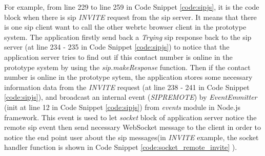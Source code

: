 \par For example, from line 229 to line 259 in Code Snippet \ref{code:sipjs}, it is the code block when there is \gls{sip} \textit{INVITE} request from the \gls{sip} server. It means that there is one \gls{sip} client want to call the other \gls{webrtc} browser client in the prototype system. The application firstly send back a \textit{Trying} \gls{sip} response back to the \gls{sip} server (at line 234 - 235 in Code Snippet \ref{code:sipjs}) to notice that the application server tries to find out if this contact number is online in the prototype system by using the \textit{sip.makeResponse} function. Then if the contact number is online in the prototype sytem, the application stores some necessary information data from the \textit{INVITE} request (at line 238 - 241 in Code Snippet \ref{code:sipjs}), and broadcast an internal event (\textit{SIPREMOTE}) by \textit{EventEmmitter} (init at line 12 in Code Snippet \ref{code:sipjs}) from \textit{events} module in Node.js framework. This event is used to let \textit{socket} block of application server notice the remote \gls{sip} event then send necessary WebSocket message to the client in order to notice the end point user about the \gls{sip} messages(in \textit{INVITE} example, the socket handler function is shown in Code Snippet \ref{code:socket_remote_invite} ).

